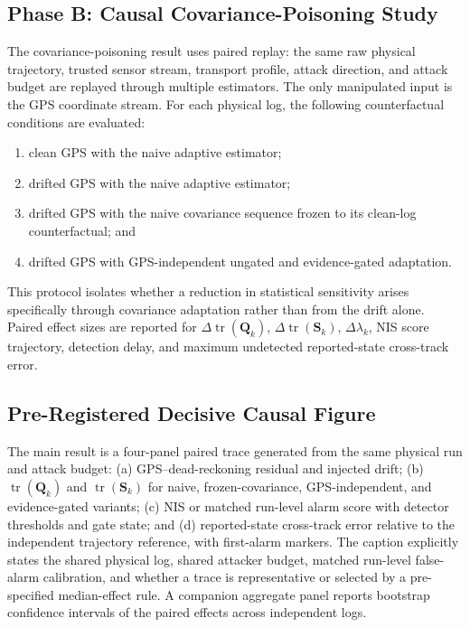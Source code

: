 \documentclass[11pt,a4paper]{article}
\begin{document}
\subsection{Phase B: Causal Covariance-Poisoning Study}
The covariance-poisoning result uses paired replay: the same raw physical trajectory, trusted sensor stream, transport profile, attack direction, and attack budget are replayed through multiple estimators. The only manipulated input is the GPS coordinate stream. For each physical log, the following counterfactual conditions are evaluated:
\begin{enumerate}
    \item clean GPS with the naive adaptive estimator;
    \item drifted GPS with the naive adaptive estimator;
    \item drifted GPS with the naive covariance sequence frozen to its clean-log counterfactual; and
    \item drifted GPS with GPS-independent ungated and evidence-gated adaptation.
\end{enumerate}
This protocol isolates whether a reduction in statistical sensitivity arises specifically through covariance adaptation rather than from the drift alone. Paired effect sizes are reported for $\Delta\operatorname{tr}(\mathbf{Q}_k)$, $\Delta\operatorname{tr}(\mathbf{S}_k)$, $\Delta\lambda_k$, NIS score trajectory, detection delay, and maximum undetected reported-state cross-track error.

\subsection{Pre-Registered Decisive Causal Figure}
The main result is a four-panel paired trace generated from the same physical run and attack budget: (a) GPS--dead-reckoning residual and injected drift; (b) $\operatorname{tr}(\mathbf{Q}_k)$ and $\operatorname{tr}(\mathbf{S}_k)$ for naive, frozen-covariance, GPS-independent, and evidence-gated variants; (c) NIS or matched run-level alarm score with detector thresholds and gate state; and (d) reported-state cross-track error relative to the independent trajectory reference, with first-alarm markers. The caption explicitly states the shared physical log, shared attacker budget, matched run-level false-alarm calibration, and whether a trace is representative or selected by a pre-specified median-effect rule. A companion aggregate panel reports bootstrap confidence intervals of the paired effects across independent logs.
\end{document}
